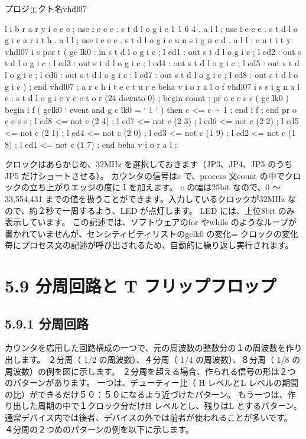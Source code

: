 \documentclass[letterpaper,10pt,dvipdfmx]{sphinxmanual}
\begin{document}
プロジェクト名vhdl07

l i b r a r y i e e e ;
use i e e e . s t d l o g i c 1 1 6 4 . a l l ;
use i e e e . s t d l o g i c a r i t h . a l l ;
use i e e e . s t d l o g i c u n s i g n e d . a l l ;
e n t i t y vhdl07 i s
por t (
gc lk0 : in s t d l o g i c ;
l ed1 : out s t d l o g i c ;
l ed2 : out s t d l o g i c ;
l ed3 : out s t d l o g i c ;
l ed4 : out s t d l o g i c ;
l ed5 : out s t d l o g i c ;
l ed6 : out s t d l o g i c ;
l ed7 : out s t d l o g i c ;
l ed8 : out s t d l o g i c
) ;
end vhdl07 ;
a r c h i t e c t u r e beha v i o r a l o f vhdl07 i s
s i g n a l c : s t d l o g i c v e c t o r (24 downto 0) ;
begin
count : pr o c e s s ( gc lk0 )
begin
i f ( gclk0 ` event and g c lk0 = ` 1 ` ) then
c \textless{}= c + 1 ;
end i f ;
end pr o c e s s ;
l ed8 \textless{}= not c (2 4) ;
l ed7 \textless{}= not c (2 3) ;
l ed6 \textless{}= not c (2 2) ;
l ed5 \textless{}= not c (2 1) ;
l ed4 \textless{}= not c (2 0) ;
l ed3 \textless{}= not c (1 9) ;
l ed2 \textless{}= not c (1 8) ;
l ed1 \textless{}= not c (1 7) ;
end beha v i o r a l ;

クロックはあらかじめ、32MHz を選択しておきます（JP3、JP4、JP5 のうちJP5 だけショートさせる）。
カウンタの信号はc で、process 文count の中でクロックの立ち上がりエッジの度に１を加えます。
c の幅は25bit なので、0 ～ 33,554,431 までの値を扱うことができます。入力しているクロックが32MHz なので、約２秒で一周するよう、LED が点灯します。
LED には、上位8bit のみ表示しています。
この記述では、ソフトウェアのfor やwhile のようなループが書かれていませんが、センシティビティリストのgclk0 の変化= クロックの変化毎にプロセス文の記述が呼び出されるため、自動的に繰り返し実行されます。


\section{5.9 分周回路と T フリップフロップ}
\label{05_try:t}

\subsection{5.9.1 分周回路}
\label{05_try:id15}
カウンタを応用した回路構成の一つで、元の周波数の整数分の１の周波数を作り出します。
２分周（ 1/2 の周波数）、４分周（ 1/4 の周波数）、８分周（ 1/8 の周波数）の例を図に示します。
２分周を超える場合、作られる信号の形は２つのパターンがあります。
一つは、デューティー比（ H レベルとL レベルの期間の比）ができるだけ５０：５０になるよう近づけたパターン。
もう一つは、作り出した周期の中で１クロック分だけH レベルとし、残りはL とするパターン。
通常デバイス内では後者、デバイスの外では前者が使われることが多いです。
４分周の２つめのパターンの例を以下に示します。
\end{document}
